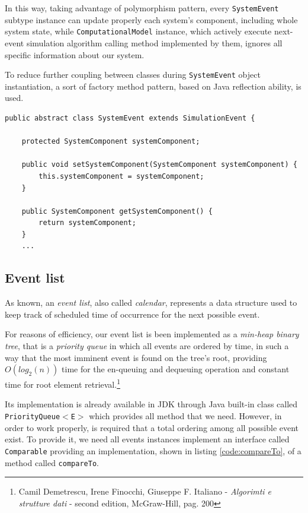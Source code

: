 \documentclass[10pt,a4paper]{article}
\begin{document}
In this way, taking advantage of polymorphism pattern, every \texttt{SystemEvent} subtype instance can update properly each system's component, including whole system state, while \texttt{ComputationalModel} instance, which actively execute next-event simulation algorithm calling method implemented by them, ignores all specific information about our system.

To reduce further coupling between classes during \texttt{SystemEvent} object instantiation, a sort of factory method pattern, based on Java reflection ability, is used.

\begin{lstlisting}[frame=lines, caption={\texttt{SimulationEvent} class implementation.}, label={code:SystemEvent}]
public abstract class SystemEvent extends SimulationEvent {

    protected SystemComponent systemComponent;

    public void setSystemComponent(SystemComponent systemComponent) {
        this.systemComponent = systemComponent;
    }

    public SystemComponent getSystemComponent() {
        return systemComponent;
    }
    ...
\end{lstlisting}

\subsection{Event list}

As known, an \textit{event list}, also called \textit{calendar}, represents a data structure used to keep track of scheduled time of occurrence for the next possible event.

For reasons of efficiency, our event list is been implemented as a \textit{min-heap binary tree}, that is a \textit{priority queue} in which all events are ordered by time, in such a way that the most imminent event is found on the tree's root, providing $O(log_2(n))$ time for the en-queuing and dequeuing operation and constant time for root element retrieval.\footnote{Camil Demetrescu, Irene Finocchi, Giuseppe F. Italiano - \textit{Algorimti e strutture dati} - second edition, McGraw-Hill, pag. 200} 

Its implementation is already available in JDK through Java built-in class called \texttt{PriorityQueue$<$E$>$} which provides all method that we need.
However, in order to work properly, is required that a total ordering among all possible event exist. To provide it, we need all events instances implement an interface called \texttt{Comparable} providing an implementation, shown in listing \ref{code:compareTo}, of a method called \texttt{compareTo}.
\end{document}

